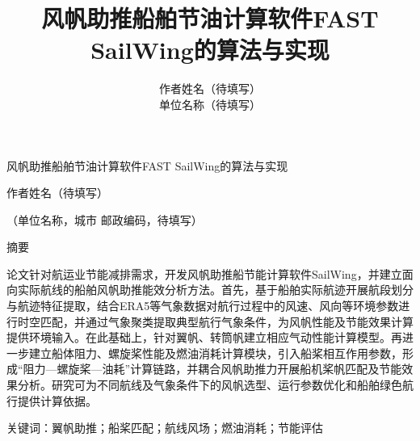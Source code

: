 \documentclass[UTF8,a4paper,twoside,zihao=5,fontset=windows]{ctexart}
\title{风帆助推船舶节油计算软件FAST SailWing的算法与实现}
\author{作者姓名（待填写）\\单位名称（待填写）}
\date{}
\renewcommand{\baselinestretch}{1.35}
\newenvironment{conferenceabstract}{\par\begingroup\renewcommand{\baselinestretch}{1}\fangsong\fontsize{9pt}{17pt}\selectfont\setlength{\leftskip}{2em}\setlength{\rightskip}{2em}\setlength{\parindent}{2em}}{\par\endgroup}
\begin{document}
\setcounter{section}{-1}
\thispagestyle{firstpage}
\begin{center}
\vspace*{8pt}
{\heiti\fontsize{22pt}{28pt}\selectfont 风帆助推船舶节油计算软件FAST SailWing的算法与实现\par}
\vspace{12pt}
{\kaishu\fontsize{12pt}{17pt}\selectfont 作者姓名（待填写）\par}
\vspace{5pt}
{\kaishu\fontsize{9pt}{17pt}\selectfont（单位名称，城市 邮政编码，待填写）\par}
\end{center}
\vspace{8pt}

\begin{center}{\heiti{}摘\quad 要}\end{center}
\begin{conferenceabstract}
论文针对航运业节能减排需求，开发风帆助推船节能计算软件SailWing，并建立面向实际航线的船舶风帆助推能效分析方法。首先，基于船舶实际航迹开展航段划分与航迹特征提取，结合ERA5等气象数据对航行过程中的风速、风向等环境参数进行时空匹配，并通过气象聚类提取典型航行气象条件，为风帆性能及节能效果计算提供环境输入。在此基础上，针对翼帆、转筒帆建立相应气动性能计算模型。再进一步建立船体阻力、螺旋桨性能及燃油消耗计算模块，引入船桨相互作用参数，形成“阻力—螺旋桨—油耗”计算链路，并耦合风帆助推力开展船机桨帆匹配及节能效果分析。研究可为不同航线及气象条件下的风帆选型、运行参数优化和船舶绿色航行提供计算依据。
\par\noindent\textnormal{关键词：}\quad 翼帆助推；船桨匹配；航线风场；燃油消耗；节能评估
\end{conferenceabstract}
\end{document}
